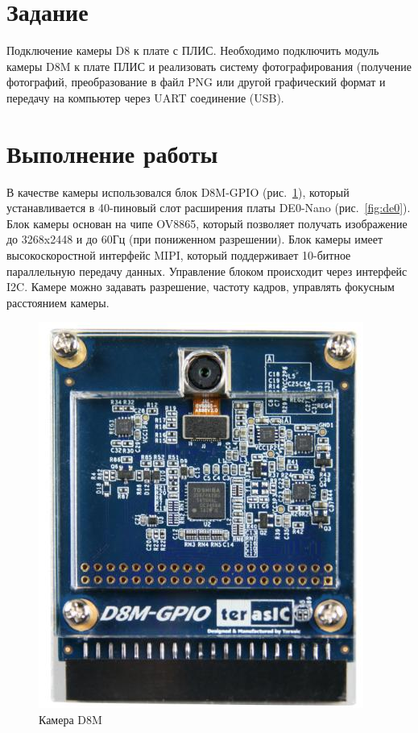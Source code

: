\documentclass[a4paper,14pt]{article}
\begin{document}
    
    \tableofcontents
    \pagebreak


    \section{Задание}

	Подключение камеры D8 к плате с ПЛИС. 
	Необходимо подключить модуль камеры D8M к плате ПЛИС и реализовать систему фотографирования (получение фотографий, преобразование в файл PNG или другой графический формат и передачу на компьютер через UART соединение (USB).

    \section{Выполнение работы}

	В качестве камеры использовался блок D8M-GPIO (рис.~\ref{fig:d8m}), который устанавливается в 40-пиновый слот расширения платы DE0-Nano (рис.~\ref{fig:de0}). 
	Блок камеры основан на чипе OV8865, который позволяет получать изображение до 3268x2448 и до 60Гц (при пониженном разрешении). 
	Блок камеры имеет высокоскоростной интерфейс MIPI, который поддерживает 10-битное параллельную передачу данных.
	Управление блоком происходит через интерфейс I2C.
	Камере можно задавать разрешение, частоту кадров, управлять фокусным расстоянием камеры.
	
	\begin{figure}[H]
		\centering
		\includegraphics[width=0.5\linewidth]{images/d8m}
		\caption{Камера D8M}
		\label{fig:d8m}
	\end{figure}
	
\end{document}
